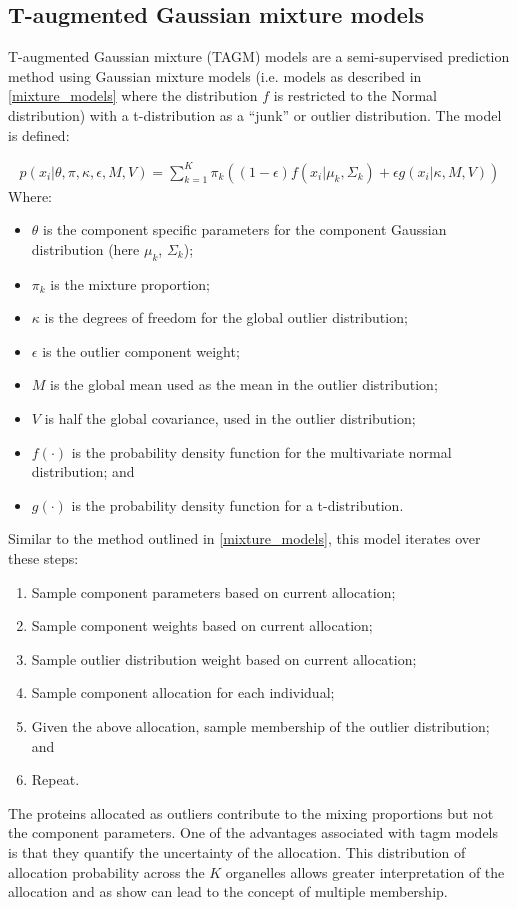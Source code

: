 \documentclass[11pt]{article} %
\begin{document}
\subsection{T-augmented Gaussian mixture models}
T-augmented Gaussian mixture (TAGM) models are a semi-supervised prediction method using Gaussian mixture models (i.e. models as described in \ref{mixture_models} where the distribution $f$ is restricted to the Normal distribution) with a t-distribution as a ``junk'' or outlier distribution. The model is defined:

\begin{align} \label{tagm_model}
p(x_i | \theta, \pi, \kappa, \epsilon, M, V) = \sum_{k=1}^K\pi_k((1 - \epsilon) f(x_i|\mu_k,\Sigma_k) + \epsilon g(x_i |\kappa, M, V))
\end{align}
Where:
\begin{itemize}
 \item $\theta$ is the component specific parameters for the component Gaussian distribution (here $\mu_k$, $\Sigma_k$);
 \item $\pi_k$ is the mixture proportion;
 \item $\kappa$ is the degrees of freedom for the global outlier distribution;
 \item $\epsilon$ is the outlier component weight;
 \item $M$ is the global mean used as the mean in the outlier distribution;
 \item $V$ is half the global covariance, used in the outlier distribution;
 \item $f(\cdot)$ is the probability density function for the multivariate normal distribution; and 
 \item $g(\cdot)$ is the probability density function for a t-distribution.
\end{itemize}
Similar to the method outlined in \ref{mixture_models}, this model iterates over these steps:
\begin{enumerate}
 \item Sample component parameters based on current allocation;
 \item Sample component weights based on current allocation;
 \item Sample outlier distribution weight based on current allocation;
 \item Sample component allocation for each individual;
 \item Given the above allocation, sample membership of the outlier distribution; and
 \item Repeat.
\end{enumerate}
The proteins allocated as outliers contribute to the mixing proportions but not the component parameters. One of the advantages associated with tagm models is that they quantify the uncertainty of the allocation. This distribution of allocation probability across the $K$ organelles allows greater interpretation of the allocation and as \citet{CrookBayesianMixtureModelling2018a} show can lead to the concept of multiple membership.
\end{document}
